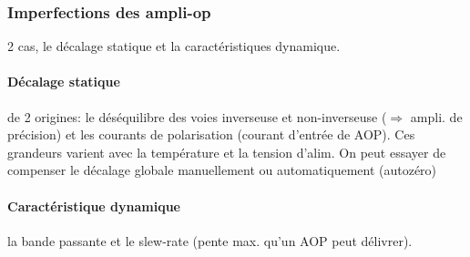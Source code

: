 \subsubsection{Imperfections des ampli-op}
2 cas, le décalage statique et la caractéristiques dynamique.
\paragraph{Décalage statique} de 2 origines: le déséquilibre des voies inverseuse et non-inverseuse (\(\Rightarrow\) ampli. de précision) et les courants de polarisation (courant d'entrée de AOP). Ces grandeurs varient avec la température et la tension d'alim. On peut essayer de compenser le décalage globale manuellement ou automatiquement (autozéro)
\paragraph{Caractéristique dynamique} la bande passante et le slew-rate (pente max. qu'un AOP peut délivrer).
